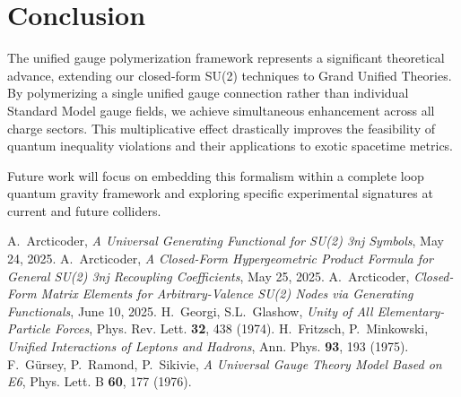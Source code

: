 \documentclass[11pt]{article}
\begin{document}
\section{Conclusion}

The unified gauge polymerization framework represents a significant theoretical advance, extending our closed-form SU(2) techniques to Grand Unified Theories. By polymerizing a single unified gauge connection rather than individual Standard Model gauge fields, we achieve simultaneous enhancement across all charge sectors. This multiplicative effect drastically improves the feasibility of quantum inequality violations and their applications to exotic spacetime metrics.

Future work will focus on embedding this formalism within a complete loop quantum gravity framework and exploring specific experimental signatures at current and future colliders.

\begin{thebibliography}{9}
 A.~Arcticoder, \textit{A Universal Generating Functional for SU(2) 3nj Symbols}, May 24, 2025.
 A.~Arcticoder, \textit{A Closed-Form Hypergeometric Product Formula for General SU(2) 3nj Recoupling Coefficients}, May 25, 2025.
 A.~Arcticoder, \textit{Closed-Form Matrix Elements for Arbitrary-Valence SU(2) Nodes via Generating Functionals}, June 10, 2025.
 H.~Georgi, S.L.~Glashow, \textit{Unity of All Elementary-Particle Forces}, Phys. Rev. Lett. \textbf{32}, 438 (1974).
 H.~Fritzsch, P.~Minkowski, \textit{Unified Interactions of Leptons and Hadrons}, Ann. Phys. \textbf{93}, 193 (1975).
 F.~Gürsey, P.~Ramond, P.~Sikivie, \textit{A Universal Gauge Theory Model Based on E6}, Phys. Lett. B \textbf{60}, 177 (1976).
\end{thebibliography}
\end{document}
